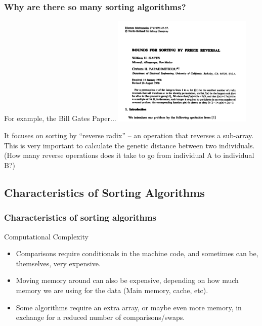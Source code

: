\documentclass{beamer}
\begin{document}
\begin{frame}
  \frametitle{Why are there so many sorting algorithms?}
  \begin{center}
    For example, the Bill Gates Paper...
  \includegraphics[width=0.5\textwidth]{img/billgates}
  \end{center}
  \medskip
  {\small It focuses on sorting by ``reverse radix'' -- an operation that
  reverses a sub-array. This is very important to calculate the
  genetic distance between two individuals. (How many reverse
  operations does it take to go from individual A to individual B?)}
\end{frame}

\subsection{Characteristics of Sorting Algorithms}

\begin{frame}
  \frametitle{Characteristics of sorting algorithms}
  \begin{block}{Computational Complexity}
    \begin{itemize}
    \item {} Comparisons require
      conditionals in the machine code, and sometimes can be,
      themselves, very expensive.
    \item {} Moving memory around can also be
      expensive, depending on how much memory we are using for the
      data (Main memory, cache, etc).
    \item {} Some algorithms require an
      extra array, or maybe even more memory, in exchange for a
      reduced number of comparisons/swaps.
    \end{itemize}
  \end{block}
\end{frame}
\end{document}
